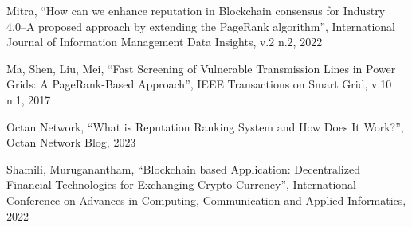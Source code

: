 \documentclass[a4paper]{article}
\begin{document}
\begin{thebibliography}{Com79}
 Mitra, ``How can we enhance reputation in Blockchain consensus for Industry 4.0–A proposed approach by extending the PageRank algorithm'', International Journal of Information Management Data Insights, v.2 n.2, 2022

 Ma, Shen, Liu, Mei, ``Fast Screening of Vulnerable Transmission Lines in Power Grids: A PageRank-Based Approach'', IEEE Transactions on Smart Grid, v.10 n.1, 2017

 Octan Network, ``What is Reputation Ranking System and How Does It Work?'', Octan Network Blog, 2023

 Shamili, Muruganantham, ``Blockchain based Application: Decentralized Financial Technologies for Exchanging Crypto Currency'', International Conference on Advances in Computing, Communication and Applied Informatics, 2022









\end{thebibliography}
\end{document}
